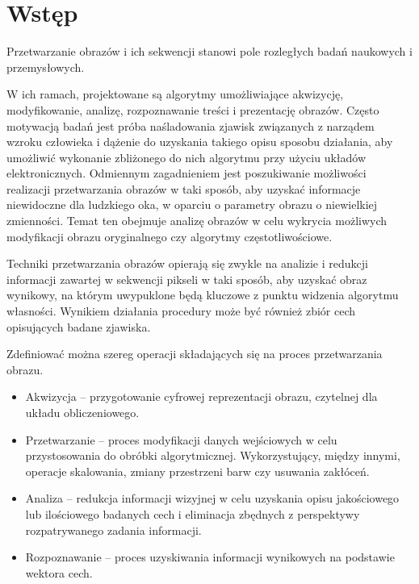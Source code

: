 \chapter{Wstęp}
\label{cha:intruduction}


Przetwarzanie obrazów i ich sekwencji stanowi pole rozległych badań naukowych i przemysłowych. %

W ich ramach, projektowane są algorytmy umożliwiające akwizycję, modyfikowanie, analizę, rozpoznawanie treści i prezentację obrazów. %
Często motywacją badań jest próba naśladowania zjawisk związanych z narządem wzroku człowieka i dążenie do uzyskania takiego opisu sposobu działania, aby umożliwić wykonanie zbliżonego do nich algorytmu przy użyciu układów elektronicznych. %
Odmiennym zagadnieniem jest poszukiwanie możliwości realizacji przetwarzania obrazów w taki sposób, aby uzyskać informacje niewidoczne dla ludzkiego oka, w oparciu o parametry obrazu o niewielkiej zmienności. Temat ten obejmuje analizę obrazów w celu wykrycia możliwych modyfikacji obrazu oryginalnego czy algorytmy częstotliwościowe. %

Techniki przetwarzania obrazów opierają się zwykle na analizie i redukcji informacji zawartej w sekwencji pikseli w taki sposób, aby uzyskać obraz wynikowy, na którym uwypuklone będą kluczowe z punktu widzenia algorytmu własności. %
Wynikiem działania procedury może być również zbiór cech opisujących badane zjawiska.

Zdefiniować można szereg operacji składających się na proces przetwarzania obrazu. \cite{Tadeusiewicz1997} 
\begin{itemize}
	\item Akwizycja -- przygotowanie cyfrowej reprezentacji obrazu, czytelnej dla układu obliczeniowego.
	
	\item Przetwarzanie -- proces modyfikacji danych wejściowych w celu przystosowania do obróbki algorytmicznej. Wykorzystujący, między innymi, operacje skalowania, zmiany przestrzeni barw czy usuwania zakłóceń.
	
	\item Analiza -- redukcja informacji wizyjnej w celu uzyskania opisu jakościowego lub ilościowego badanych cech i eliminacja zbędnych z perspektywy rozpatrywanego zadania informacji.
	
	\item Rozpoznawanie -- proces uzyskiwania informacji wynikowych na podstawie wektora cech.
\end{itemize}


